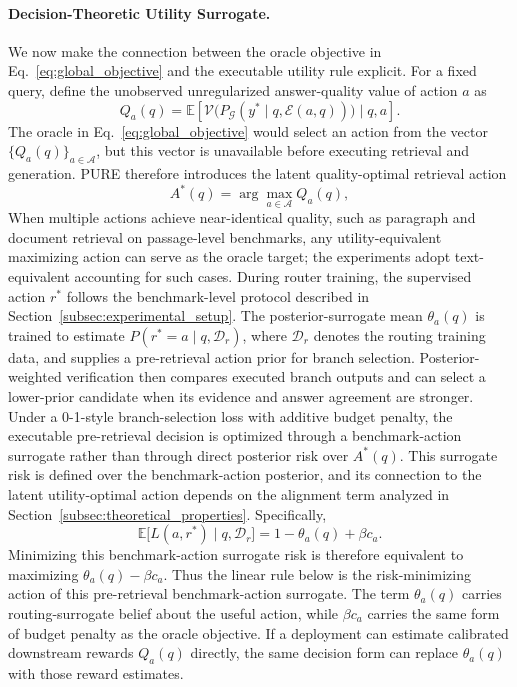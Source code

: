 \documentclass[a4paper,fleqn]{cas-dc}
\begin{document}
\paragraph{Decision-Theoretic Utility Surrogate.}
We now make the connection between the oracle objective in Eq.~\eqref{eq:global_objective} and the executable utility rule explicit. 
For a fixed query, define the unobserved unregularized answer-quality value of action $a$ as
\begin{equation}
\label{eq:latent_action_value}
Q_a(q)
=
\mathbb{E}
\left[
\mathcal{V}\big(P_{\mathcal{G}}(y^* \mid q,\mathcal{E}(a,q))\big)
\mid q,a
\right].
\end{equation}
The oracle in Eq.~\eqref{eq:global_objective} would select an action from the vector $\{Q_a(q)\}_{a\in\mathcal{A}}$, but this vector is unavailable before executing retrieval and generation. 
PURE therefore introduces the latent quality-optimal retrieval action
\begin{equation}
\label{eq:latent_best_action}
A^*(q)
=
\arg\max_{a\in\mathcal{A}} Q_a(q),
\end{equation}
When multiple actions achieve near-identical quality, such as paragraph and document retrieval on passage-level benchmarks, any utility-equivalent maximizing action can serve as the oracle target; the experiments adopt text-equivalent accounting for such cases.
During router training, the supervised action $r^*$ follows the benchmark-level protocol described in Section~\ref{subsec:experimental_setup}. The posterior-surrogate mean $\theta_a(q)$ is trained to estimate $P(r^*=a\mid q,\mathcal{D}_r)$, where $\mathcal{D}_r$ denotes the routing training data, and supplies a pre-retrieval action prior for branch selection. Posterior-weighted verification then compares executed branch outputs and can select a lower-prior candidate when its evidence and answer agreement are stronger. 
Under a 0-1-style branch-selection loss with additive budget penalty, the executable pre-retrieval decision is optimized through a benchmark-action surrogate rather than through direct posterior risk over $A^*(q)$. This surrogate risk is defined over the benchmark-action posterior, and its connection to the latent utility-optimal action depends on the alignment term analyzed in Section~\ref{subsec:theoretical_properties}. Specifically,
\begin{equation}
\label{eq:surrogate_risk}
\mathbb{E}\big[L(a,r^*)\mid q,\mathcal{D}_r\big]
=
1-\theta_a(q)+\beta c_a .
\end{equation}
Minimizing this benchmark-action surrogate risk is therefore equivalent to maximizing $\theta_a(q)-\beta c_a$. 
Thus the linear rule below is the risk-minimizing action of this pre-retrieval benchmark-action surrogate. The term $\theta_a(q)$ carries routing-surrogate belief about the useful action, while $\beta c_a$ carries the same form of budget penalty as the oracle objective. 
If a deployment can estimate calibrated downstream rewards $Q_a(q)$ directly, the same decision form can replace $\theta_a(q)$ with those reward estimates.
\end{document}
